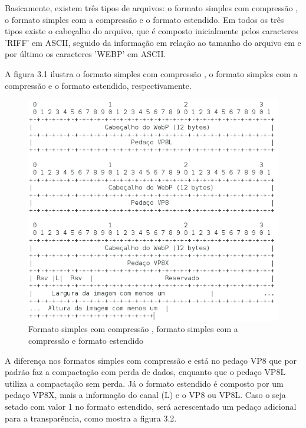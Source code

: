 \documentclass[espaco=simples,appendix=Name]{abnt}
\begin{document}
Basicamente, existem três tipos de arquivos: o formato simples com compressão , o formato simples com a compressão  e o formato estendido. Em todos os três tipos existe o cabeçalho do arquivo, que é composto inicialmente pelos caracteres 'RIFF' em ASCII, seguido da informação em relação ao tamanho do arquivo em  e por último os caracteres 'WEBP' em ASCII.

\newpage

A figura 3.1 ilustra o formato simples com compressão , o formato simples com a compressão  e o formato estendido, respectivamente.

\begin{figure}[h]
  \centering
    \includegraphics[scale=0.5]{LossyLossLessExtended.png}
  \caption{Formato simples com compressão , formato simples com a compressão  e formato estendido}
\end{figure}

A diferença nos formatos simples com compressão  e  está no pedaço VP8 que por padrão faz a compactação com perda de dados, enquanto que o pedaço VP8L utiliza a compactação sem perda. Já o formato estendido é composto por um pedaço VP8X, mais a informação do canal  (L) e o  VP8 ou VP8L. Caso o  seja setado com valor 1 no formato estendido, será acrescentado um pedaço adicional para a transparência, como mostra a figura 3.2.
\end{document}
